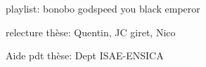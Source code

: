 
playlist:
bonobo
godspeed you black emperor

relecture thèse:
Quentin,
JC giret,
Nico

Aide pdt thèse:
Dept ISAE-ENSICA